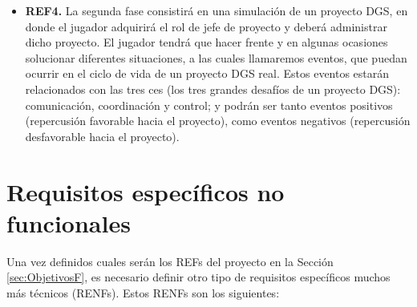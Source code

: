 \begin{itemize}
	\item \textbf{REF4.} La segunda fase consistirá en una simulación de un proyecto DGS, en donde el jugador adquirirá el rol de jefe de proyecto y deberá administrar dicho proyecto. El jugador tendrá que hacer frente y en algunas ocasiones solucionar diferentes situaciones, a las cuales llamaremos eventos, que puedan ocurrir en el ciclo de vida de un proyecto DGS real. Estos eventos estarán relacionados con las tres ces (los tres grandes desafíos de un proyecto DGS): comunicación, coordinación y control; y podrán ser tanto eventos positivos (repercusión favorable hacia el proyecto), como eventos negativos (repercusión desfavorable hacia el proyecto).
\end{itemize}


\section{Requisitos específicos no funcionales}
\label{sec:ObjetivosT}

Una vez definidos cuales serán los REFs del proyecto en la Sección \ref{sec:ObjetivosF}, es necesario definir otro tipo de requisitos específicos muchos más técnicos (RENFs). Estos RENFs son los siguientes:

